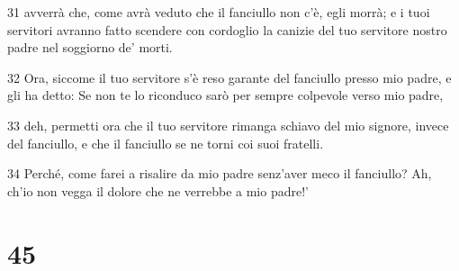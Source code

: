 \par 31 avverrà che, come avrà veduto che il fanciullo non c'è, egli morrà; e i tuoi servitori avranno fatto scendere con cordoglio la canizie del tuo servitore nostro padre nel soggiorno de' morti.
\par 32 Ora, siccome il tuo servitore s'è reso garante del fanciullo presso mio padre, e gli ha detto: Se non te lo riconduco sarò per sempre colpevole verso mio padre,
\par 33 deh, permetti ora che il tuo servitore rimanga schiavo del mio signore, invece del fanciullo, e che il fanciullo se ne torni coi suoi fratelli.
\par 34 Perché, come farei a risalire da mio padre senz'aver meco il fanciullo? Ah, ch'io non vegga il dolore che ne verrebbe a mio padre!'

\chapter{45}

